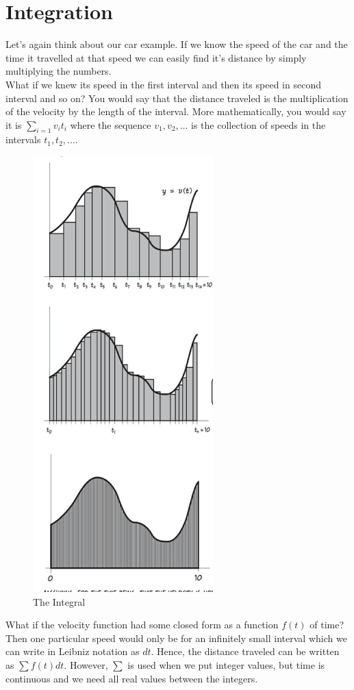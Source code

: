 \section{Integration}
Let's again think about our car example. If we know the speed of the car and the time it travelled at that speed we can easily find it's distance by simply multiplying the numbers.\\
What if we knew its speed in the first interval and then its speed in second interval and so on? You would say that the distance traveled is the multiplication of the velocity by the length of the interval. More mathematically, you would say it is $\sum_{i=1}v_it_i$ where the sequence $v_1,v_2, \dots$ is the collection of speeds in the intervals $t_1,t_2,\dots$.\\
\begin{figure}[ht]
    \centering
    \includegraphics[width=0.5\linewidth]{Photos/The integral.png}
    \caption{The Integral}
\end{figure}
What if the velocity function had some closed form as a function $f(t)$ of time? Then one particular speed would only be for an infinitely small interval which we can write in Leibniz notation as $dt$. Hence, the distance traveled can be written as $\sum f(t) dt$. However, $\sum$ is used when we put integer values, but time is continuous and we need all real values between the integers.\\
